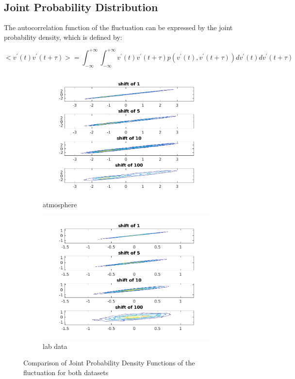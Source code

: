 \documentclass[12pt]{article}
\begin{document}
\subsection{Joint Probability Distribution}
The autocorrelation function of the fluctuation can be expressed by the joint probability density, which is defined by:

\begin{equation}
<v^{'}(t)v^{'}(t+\tau)> = \int_{-\infty}^{+\infty}\int_{-\infty}^{+\infty} v^{'}(t)v^{'}(t+\tau)p(v^{'}(t),v^{'}(t+\tau))dv^{'}(t)dv^{'}(t+\tau)
\end{equation}
\begin{figure}[H]
\begin{subfigure}{0.5\textwidth}
  \centering
  \includegraphics[width=1\linewidth]{figures/jpdf_atmo.png}
  \caption{atmosphere}
\end{subfigure}
\begin{subfigure}{0.5\textwidth}
  \centering
  \includegraphics[width=1\linewidth]{figures/jpdf_center.png}
  \caption{lab data}
\end{subfigure}
\caption{Comparison of Joint Probability Density Functions of the fluctuation for both datasets}
\label{fig:comparison_jpdf}
\end{figure}
\end{document}

